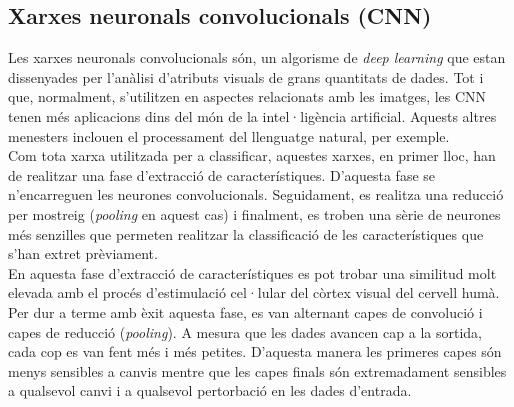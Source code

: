 \documentclass[a4paper,12pt]{article}
\begin{document}
\subsection*{Xarxes neuronals convolucionals (CNN)}
Les xarxes neuronals convolucionals són, un algorisme de \textit{deep learning} que estan dissenyades per l'anàlisi d'atributs visuals de grans quantitats de dades. Tot i que, normalment, s'utilitzen en aspectes relacionats amb les imatges, les CNN tenen més aplicacions dins del món de la intel·ligència artificial. Aquests altres menesters inclouen el processament del llenguatge natural, per exemple.\\
Com tota xarxa utilitzada per a classificar, aquestes xarxes, en primer lloc, han de realitzar una fase d'extracció de característiques. D'aquesta fase se n'encarreguen les neurones convolucionals. Seguidament, es realitza una reducció per mostreig (\textit{pooling} en aquest cas) i finalment, es troben una sèrie de neurones més senzilles que permeten realitzar la classificació de les característiques que s'han extret prèviament.\\
En aquesta fase d'extracció de característiques es pot trobar una similitud molt elevada amb el procés d'estimulació cel·lular del còrtex visual del cervell humà.\\
Per dur a terme amb èxit aquesta fase, es van alternant capes de convolució i capes de reducció (\textit{pooling}). A mesura que les dades avancen cap a la sortida, cada cop es van fent més i més petites. D'aquesta manera les primeres capes són menys sensibles a canvis mentre que les capes finals són extremadament sensibles a qualsevol canvi i a qualsevol pertorbació en les dades d'entrada.
\end{document}
